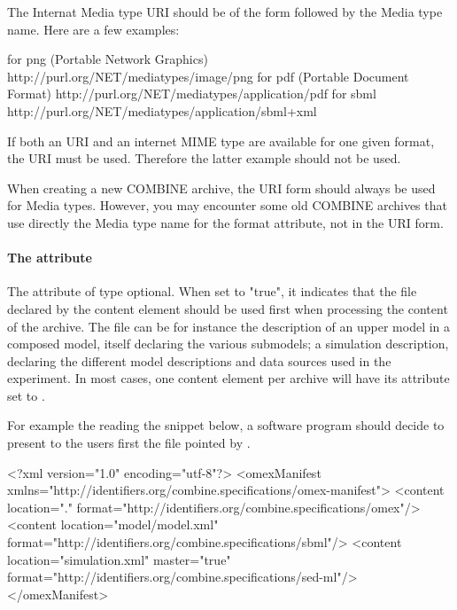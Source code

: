 The Internat Media type  URI should be of the form 
followed by the Media type name. Here are a few examples:

\begin{example}
    for png (Portable Network Graphics) http://purl.org/NET/mediatypes/image/png
    for pdf (Portable Document Format) http://purl.org/NET/mediatypes/application/pdf
    for sbml http://purl.org/NET/mediatypes/application/sbml+xml
\end{example}

If both an  URI and an internet MIME type are available for one given format, the
 URI must be used. Therefore the latter example should not be used. 

When creating a new COMBINE archive, the URI form should always be used for Media types. However, you may encounter some
old COMBINE archives that use directly the Media type name for the format attribute, not in the URI form.

\paragraph{The  attribute}
\label{active_document}
The  attribute of type  optional. When set to "true", it 
indicates that the file declared by the content element should be used first when 
processing the content of the archive. The file can be for instance the description of an upper model in a 
composed model, itself declaring the various submodels; a simulation description, 
declaring the different model descriptions and data sources used in the 
experiment. In most cases, one content element per archive will have its  
attribute set to .

For example the reading the snippet below, a software program should decide to present to the users first the file pointed by  .

\begin{example}
<?xml version="1.0" encoding="utf-8"?>
<omexManifest xmlns="http://identifiers.org/combine.specifications/omex-manifest">
    <content location="." format="http://identifiers.org/combine.specifications/omex"/>
    <content location="model/model.xml" 
        format="http://identifiers.org/combine.specifications/sbml"/>
    <content location="simulation.xml" master="true"
        format="http://identifiers.org/combine.specifications/sed-ml"/>
</omexManifest>
\end{example}


